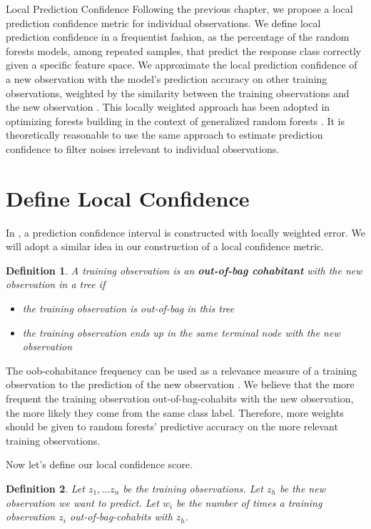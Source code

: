 \documentclass[12pt]{pom_thesis}
\newtheorem{definition}{Definition}[section]
\begin{document}
\begin{chapter}{Local Prediction Confidence}
\indent Following the previous chapter, we propose a local prediction confidence metric for individual observations. We define local prediction confidence in a frequentist fashion, as the percentage of the random forests models, among repeated samples, that predict the response class correctly given a specific feature space. We approximate the local prediction confidence of a new observation with the model's prediction accuracy on other training observations, weighted by the similarity between the training observations and the new observation . This locally weighted approach has been adopted in optimizing forests building in the context of generalized random forests \citep{grf}. It is theoretically reasonable to use the same approach to estimate prediction confidence to filter noises irrelevant to individual observations. 

\section{Define Local Confidence}
In \cite{JMLR}, a prediction confidence interval is constructed with locally weighted error. We will adopt a similar idea in our construction of a local confidence metric.

\begin{definition}
A training observation is an \textbf{out-of-bag cohabitant} with the new observation in a tree if
\begin{itemize}
    \item the training observation is out-of-bag in this tree
    \item the training observation ends up in the same terminal node
with the new observation
\end{itemize}
\end{definition}

The oob-cohabitance frequency can be used as a relevance measure of a training observation to the prediction of the new observation \citep{grf}. We believe that the more frequent the training observation out-of-bag-cohabits with the new observation, the more likely they come from the same class label. Therefore, more weights should be given to random forests' predictive accuracy on the more relevant training observations. 

Now let's define our local confidence score.

\begin{definition}
Let $z_1,...z_n$ be the training observations. Let $z_h$ be the new observation we want to predict. Let $w_i$ be the number of times a training observation $z_i$ out-of-bag-cohabits with $z_h$. 


\end{definition}
\end{chapter}
\end{document}
